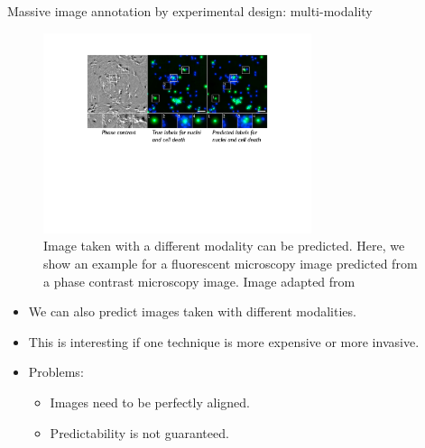 \documentclass[xcolor=pdftex,dvipsnames,table]{beamer}
\begin{document}
\begin{frame}{Massive image annotation by experimental design: multi-modality}
\begin{figure}[htb]
   \centering
   \includegraphics[width=0.7\textwidth]{../graphics/in_silico_labeling.pdf}
   \caption{Image taken with a different modality can be predicted. Here, we show an example for a fluorescent microscopy image predicted from a phase contrast microscopy image. Image adapted from \cite{Christiansen2018}}
\end{figure}
\begin{itemize}
   \item We can also predict images taken with different modalities. 
   \item This is interesting if one technique is more expensive or more invasive.
   \item Problems:
   \begin{itemize}
      \item Images need to be perfectly aligned.
      \item Predictability is not guaranteed. 
   \end{itemize}   
\end{itemize}
\end{frame}
\end{document}

